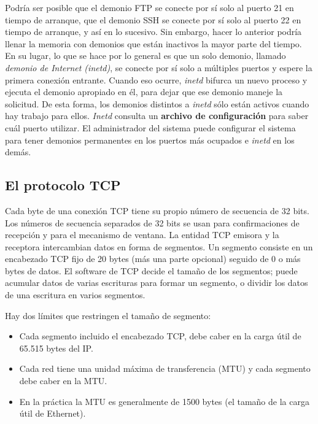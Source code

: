 \documentclass[10pt,a4paper]{report}
\begin{document}
	\par Podría ser posible que el demonio FTP se conecte por sí solo al puerto 21 en 
tiempo de arranque, que el demonio SSH se conecte por sí solo al puerto 22 en tiempo 
de arranque, y así en lo sucesivo. Sin embargo, hacer lo anterior podría llenar la 
memoria con demonios que están inactivos la mayor parte del tiempo. En su lugar, lo 
que se hace por lo general es que un solo demonio, llamado \emph{demonio de 
Internet (inetd)}, se conecte por sí solo a múltiples puertos y espere la primera 
conexión entrante. Cuando eso ocurre, \emph{inetd} bifurca un nuevo proceso y 
ejecuta el demonio apropiado en él, para dejar que ese demonio maneje la solicitud. De 
esta forma, los demonios distintos a \textit{inetd} sólo están activos cuando hay 
trabajo para ellos. \emph{Inetd} consulta un \textbf{archivo de configuración} para 
saber cuál puerto utilizar. El administrador del sistema puede 
configurar el sistema para tener demonios permanentes en los puertos más ocupados 
e \emph{inetd} en los demás.

\subsection{El protocolo TCP}

	\par Cada byte de una conexión TCP tiene su propio número de secuencia de 32 bits. 
Los números de secuencia separados de 32 bits se usan para confirmaciones de 
recepción y para el mecanismo de ventana. La entidad TCP emisora y la receptora 
intercambian datos en forma de segmentos. Un segmento consiste en un encabezado 
TCP fijo de 20 bytes (más una parte opcional) seguido de 0 o más bytes de datos. El 
software de TCP decide el tamaño de los segmentos; puede acumular datos de varias 
escrituras para formar un segmento, o dividir los datos de una escritura en varios 
segmentos.

	\par Hay dos límites que restringen el tamaño de segmento:
		\begin{itemize}
			\item Cada segmento incluido el encabezado TCP, debe caber en la carga útil de 
		65.515 bytes del IP.
			\item Cada red tiene una unidad máxima de transferencia (MTU) y cada segmento 
		debe caber en la MTU.
			\item En la práctica la MTU es generalmente de 1500 bytes (el tamaño de la 
		carga útil de Ethernet).
		\end{itemize}	 
\end{document}
